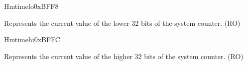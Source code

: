 \begin{register}{H}{mtimelo}{0xBFF8}\label{regdesc:CLINTMTIMELOREG}
%
\regnewline%
\begin{regdesc}
\begin{reglist}
\label{fielddesc:CLINTMTIMELO}\item [MTIMELO] Represents the current value of the lower 32 bits of the system counter. (RO) 
\end{reglist}
\end{regdesc}
\end{register}

\begin{register}{H}{mtimehi}{0xBFFC}\label{regdesc:CLINTMTIMEHIREG}
%
\regnewline%
\begin{regdesc}
\begin{reglist}
\label{fielddesc:CLINTMTIMEHI}\item [MTIMEHI] Represents the current value of the higher 32 bits of the system counter. (RO) 
\end{reglist}
\end{regdesc}
\end{register}
